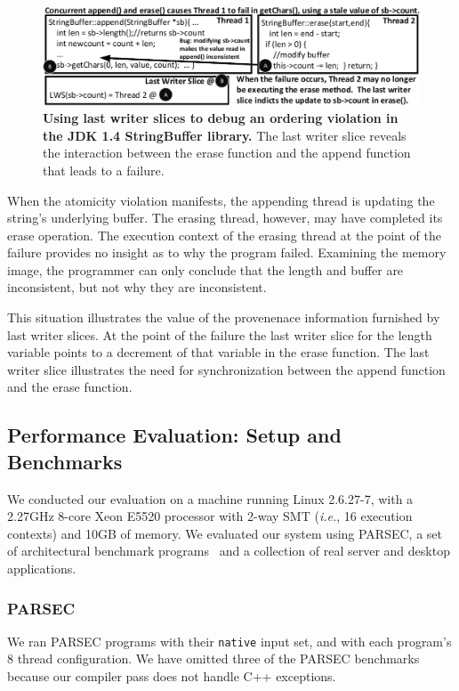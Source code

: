 \documentclass[preprint,9pt]{sigplanconf}
\begin{document}
\begin{figure}[h]
\centering
\includegraphics[width=\columnwidth]{figs/JDKStringBufferDebug.pdf}
\caption{\label{fig:jdklws}{\bf Using last writer slices to debug an
ordering violation in the JDK 1.4 StringBuffer library.} The last writer slice reveals the interaction between the erase function and the append function that leads to a failure.}
\end{figure}

When the atomicity violation manifests, the appending thread is updating the
string's underlying buffer.  The erasing thread, however, may have completed
its erase operation.  The execution context of the erasing thread at the point
of the failure provides no insight as to why the program failed.  Examining the memory image, the programmer can only conclude that the length and buffer are 
inconsistent, but not why they are inconsistent.

This situation illustrates the value of the provenenace information furnished
by last writer slices.  At the point of the failure the last writer slice for
the length variable points to a decrement of that variable in the erase
function.  The last writer slice illustrates the need for synchronization
between the append function and the erase function.  


\subsection{Performance Evaluation: Setup and Benchmarks}

We conducted our evaluation on a machine running Linux 2.6.27-7, with a 2.27GHz
8-core Xeon E5520 processor with 2-way SMT ({\em i.e.}, 16 execution contexts)
and 10GB of memory.  We evaluated our system using PARSEC, a set of
architectural benchmark programs~\cite{parsec} and a collection of real server
and desktop applications.    

\subsubsection{PARSEC}

We ran PARSEC programs with their {\tt native} input set, and with each
program's 8 thread configuration. We have omitted three of the PARSEC
benchmarks because our compiler pass does not handle C++ exceptions.    
\end{document}
